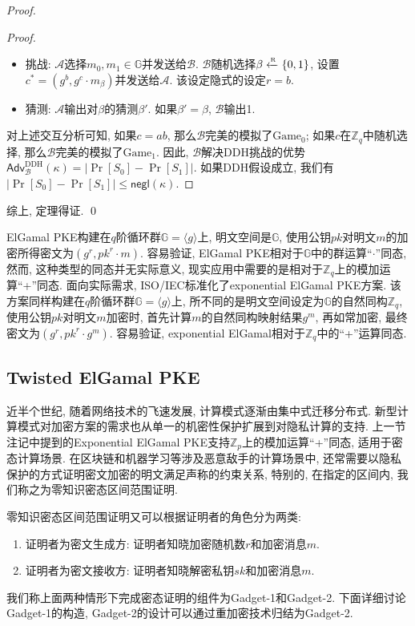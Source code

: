 \begin{proof}
\begin{proof}
\begin{itemize}
	\item 挑战: $\mathcal{A}$选择$m_0, m_1 \in \mathbb{G}$并发送给$\mathcal{B}$.  
		$\mathcal{B}$随机选择$\beta \xleftarrow{\textup{\tiny R}} \{0,1\}$, 
		设置$c^* = (g^b, g^c \cdot m_\beta)$并发送给$\mathcal{A}$. 该设定隐式的设定$r = b$.   

	\item 猜测: $\mathcal{A}$输出对$\beta$的猜测$\beta'$. 如果$\beta' = \beta$, $\mathcal{B}$输出1. 
\end{itemize} 
对上述交互分析可知, 如果$c = ab$, 那么$\mathcal{B}$完美的模拟了$\text{Game}_0$; 如果$c$在$\mathbb{Z}_q$中随机选择, 
那么$\mathcal{B}$完美的模拟了$\text{Game}_1$. 
因此, $\mathcal{B}$解决DDH挑战的优势$\mathsf{Adv}_\mathcal{B}^\text{DDH}(\kappa) = |\Pr[S_0]-\Pr[S_1]|$. 
如果DDH假设成立, 我们有$|\Pr[S_0]-\Pr[S_1]| \leq \mathsf{negl}(\kappa)$. 
\end{proof}
综上, 定理得证. \qed
\end{proof}

\begin{note}[具有实际应用价值的同态]
ElGamal PKE构建在$q$阶循环群$\mathbb{G} = \langle g \rangle$上, 明文空间是$\mathbb{G}$, 使用公钥$pk$对明文$m$的加密所得密文为$(g^r, pk^r \cdot m)$. 
容易验证, ElGamal PKE相对于$\mathbb{G}$中的群运算``$\cdot$''同态, 然而, 这种类型的同态并无实际意义, 
现实应用中需要的是相对于$\mathbb{Z}_q$上的模加运算``+''同态. 
面向实际需求, ISO/IEC标准化了exponential ElGamal PKE方案. 
该方案同样构建在$q$阶循环群$\mathbb{G} = \langle g \rangle$上, 所不同的是明文空间设定为$\mathbb{G}$的自然同构$\mathbb{Z}_q$, 
使用公钥$pk$对明文$m$加密时, 首先计算$m$的自然同构映射结果$g^m$, 再如常加密, 最终密文为$(g^r, pk^r \cdot g^m)$. 
容易验证, exponential ElGamal相对于$\mathbb{Z}_q$中的``+''运算同态. 
\end{note}

\subsection{Twisted ElGamal PKE}
近半个世纪, 随着网络技术的飞速发展, 计算模式逐渐由集中式迁移分布式. 新型计算模式对加密方案的需求也从单一的机密性保护扩展到对隐私计算的支持. 
上一节注记中提到的Exponential ElGamal PKE支持$\mathbb{Z}_p$上的模加运算``+''同态, 适用于密态计算场景. 
在区块链和机器学习等涉及恶意敌手的计算场景中, 还常需要以隐私保护的方式证明密文加密的明文满足声称的约束关系, 特别的, 在指定的区间内, 
我们称之为零知识密态区间范围证明. 

零知识密态区间范围证明又可以根据证明者的角色分为两类: 
\begin{enumerate}
    \item 证明者为密文生成方: 证明者知晓加密随机数$r$和加密消息$m$. 
    \item 证明者为密文接收方: 证明者知晓解密私钥$sk$和加密消息$m$.  
\end{enumerate}
我们称上面两种情形下完成密态证明的组件为Gadget-1和Gadget-2. 下面详细讨论Gadget-1的构造, Gadget-2的设计可以通过重加密技术归结为Gadget-2. 

